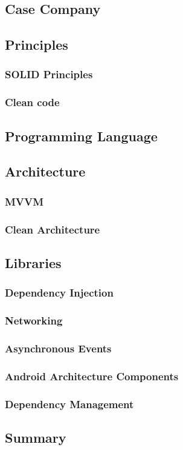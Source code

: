 \subsection{Case Company}

\subsection{Principles}
\subsubsection{SOLID Principles}
\label{section:4.2.1}
\subsubsection{Clean code}
\label{section:4.2.2}

\subsection{Programming Language}
\label{section:4.3}

\subsection{Architecture}
\subsubsection{MVVM}
\label{section:4.4.1}
\subsubsection{Clean Architecture}
\label{section:4.4.2}

\subsection{Libraries}


\subsubsection{Dependency Injection}
\label{section:4.5.1}
\subsubsection{Networking}
\label{section:4.5.2}
\subsubsection{Asynchronous Events}
\label{section:4.5.3}
\subsubsection{Android Architecture Components}
\label{section:4.5.4}
\subsubsection{Dependency Management}
\label{section:4.5.5}

\subsection{Summary}